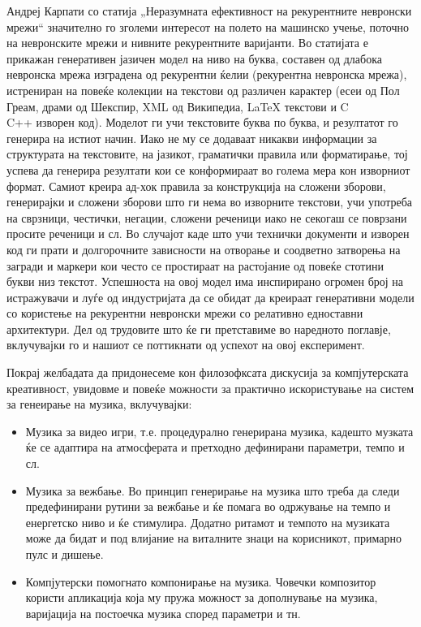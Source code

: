 Андреј Карпати со статија „Неразумната ефективност на рекурентните невронски мрежи“ \cite{AndrejKarpathy2015} значително го зголеми интересот на полето на машинско учење, поточно на невронските мрежи и нивните рекурентните варијанти. Во статијата е прикажан генеративен јазичен модел на ниво на буква, составен од длабока невронска мрежа изградена од рекурентни ќелии (рекурентна невронска мрежа), истрениран на повеќе колекции на текстови од различен карактер (есеи од Пол Греам, драми од Шекспир, XML од Википедиа, LaTeX текстови и C\\C++ изворен код). Моделот ги учи текстовите буква по буква, и резултатот го генерира на истиот начин. Иако не му се додаваат никакви информации за структурата на текстовите, на јазикот, граматички правила или форматирање, тој успева да генерира резултати кои се конформираат во голема мера кон изворниот формат. Самиот креира ад-хок правила за конструкција на сложени зборови, генерирајки и сложени зборови што ги нема во изворните текстови, учи употреба на сврзници, честички, негации, сложени реченици иако не секогаш се поврзани просите реченици и сл. Во случајот каде што учи технички документи и изворен код ги прати и долгорочните зависности на отворање и соодветно затворења на загради и маркери кои често се простираат на растојание од повеќе стотини букви низ текстот. Успешноста на овој модел има инспирирано огромен број на истражувачи и луѓе од индустријата да се обидат да креираат генеративни модели со користење на рекурентни невронски мрежи со релативно едноставни архитектури. Дел од трудовите што ќе ги претставиме во наредното поглавје, вклучувајки го и нашиот се поттикнати од успехот на овој експеримент.

Покрај желбадата да придонесеме кон филозофксата дискусија за компјутерската креативност, увидовме и повеќе можности за практично искористување на систем за генеирање на музика, вклучувајки:
\begin{itemize}
\item Музика за видео игри, т.е. процедурално генерирана музика, кадешто музката ќе се адаптира на атмосферата и претходно дефинирани параметри, темпо и сл.
\item Музика за вежбање. Во принцип генерирање на музика што треба да следи предефинирани рутини за вежбање и ќе помага во одржување на темпо и енергетско ниво и ќе стимулира. Додатно ритамот и темпото на музиката може да бидат и под влијание на виталните знаци на корисникот, примарно пулс и дишење.
\item Компјутерски помогнато компонирање на музика. Човечки композитор користи апликација која му пружа можност за дополнување на музика, варијација на постоечка музика според параметри и тн.
\end{itemize}

